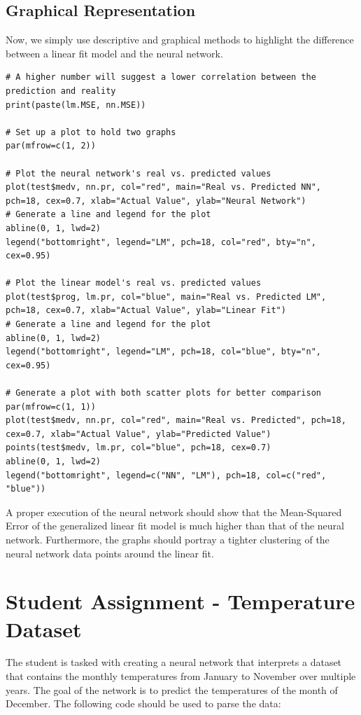 \documentclass[11pt]{article}
\begin{document}
\subsection{Graphical Representation}

Now, we simply use descriptive and graphical methods to highlight the difference between a linear fit model and the neural network.

\begin{lstlisting}
# A higher number will suggest a lower correlation between the prediction and reality
print(paste(lm.MSE, nn.MSE))

# Set up a plot to hold two graphs
par(mfrow=c(1, 2))

# Plot the neural network's real vs. predicted values
plot(test$medv, nn.pr, col="red", main="Real vs. Predicted NN", pch=18, cex=0.7, xlab="Actual Value", ylab="Neural Network")
# Generate a line and legend for the plot
abline(0, 1, lwd=2)
legend("bottomright", legend="LM", pch=18, col="red", bty="n", cex=0.95)

# Plot the linear model's real vs. predicted values
plot(test$prog, lm.pr, col="blue", main="Real vs. Predicted LM", pch=18, cex=0.7, xlab="Actual Value", ylab="Linear Fit")
# Generate a line and legend for the plot
abline(0, 1, lwd=2)
legend("bottomright", legend="LM", pch=18, col="blue", bty="n", cex=0.95)

# Generate a plot with both scatter plots for better comparison
par(mfrow=c(1, 1))
plot(test$medv, nn.pr, col="red", main="Real vs. Predicted", pch=18, cex=0.7, xlab="Actual Value", ylab="Predicted Value")
points(test$medv, lm.pr, col="blue", pch=18, cex=0.7)
abline(0, 1, lwd=2)
legend("bottomright", legend=c("NN", "LM"), pch=18, col=c("red", "blue"))
\end{lstlisting}

A proper execution of the neural network should show that the Mean-Squared Error of the generalized linear fit model is much higher than that of the neural network. Furthermore, the graphs should portray a tighter clustering of the neural network data points around the linear fit. 

\section{Student Assignment - Temperature Dataset} 

The student is tasked with creating a neural network that interprets a dataset that contains the monthly temperatures from January to November over multiple years. The goal of the network is to predict the temperatures of the month of December. The following code should be used to parse the data:
\end{document}
